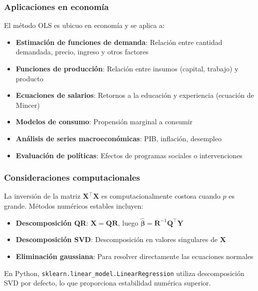 \documentclass[
  doc,
  floatsintext,
  longtable,
  a4paper,
  nolmodern,
  notxfonts,
  notimes,
  12pt,
  colorlinks=true,linkcolor=blue,citecolor=blue,urlcolor=blue]{apa7}
\providecommand{\tightlist}{%
  \setlength{\itemsep}{0pt}\setlength{\parskip}{0pt}}
\begin{document}
\subsubsection{Aplicaciones en
economía}\label{aplicaciones-en-economuxeda}

El método OLS es ubicuo en economía y se aplica a:

\begin{itemize}
\tightlist
\item
  \textbf{Estimación de funciones de demanda}: Relación entre cantidad
  demandada, precio, ingreso y otros factores
\item
  \textbf{Funciones de producción}: Relación entre insumos (capital,
  trabajo) y producto
\item
  \textbf{Ecuaciones de salarios}: Retornos a la educación y experiencia
  (ecuación de Mincer)
\item
  \textbf{Modelos de consumo}: Propensión marginal a consumir
\item
  \textbf{Análisis de series macroeconómicas}: PIB, inflación, desempleo
\item
  \textbf{Evaluación de políticas}: Efectos de programas sociales o
  intervenciones
\end{itemize}

\subsubsection{Consideraciones
computacionales}\label{consideraciones-computacionales}

La inversión de la matriz \(\mathbf{X}^\top\mathbf{X}\) es
computacionalmente costosa cuando \(p\) es grande. Métodos numéricos
estables incluyen:

\begin{itemize}
\tightlist
\item
  \textbf{Descomposición QR}: \(\mathbf{X} = \mathbf{Q}\mathbf{R}\),
  luego
  \(\hat{\boldsymbol{\beta}} = \mathbf{R}^{-1}\mathbf{Q}^\top\mathbf{Y}\)
\item
  \textbf{Descomposición SVD}: Descomposición en valores singulares de
  \(\mathbf{X}\)
\item
  \textbf{Eliminación gaussiana}: Para resolver directamente las
  ecuaciones normales
\end{itemize}

En Python, \texttt{sklearn.linear\_model.LinearRegression} utiliza
descomposición SVD por defecto, lo que proporciona estabilidad numérica
superior.
\end{document}
